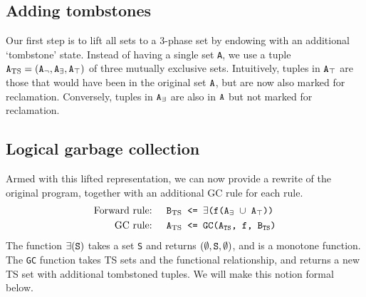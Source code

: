 \documentclass[10pt]{proc}
\numberwithin{equation}{section}
\renewcommand{\tt}[1]{\ifmmode\text{\texttt{#1}}\else\texttt{#1}\fi}
\begin{document}
\subsection{Adding tombstones}
Our first step is to lift all sets to a 3-phase set by endowing with an additional `tombstone' state.
Instead of having a single set \tt{A}, we use a tuple $\tt{A}_\text{TS} = (\tt{A}_\neg, \tt{A}_\exists, \tt{A}_\top)$ of three mutually exclusive sets.
Intuitively, tuples in $\tt{A}_\top$ are those that would have been in the original set $\tt{A}$, but are now also marked for reclamation.
Conversely, tuples in $\tt{A}_\exists$ are also in $\tt{A}$ but not marked for reclamation.


\subsection{Logical garbage collection}
Armed with this lifted representation, we can now provide a rewrite of the original program, together with an additional GC rule for each rule.
\begin{align}
\text{Forward rule: } && \tt{B}_\text{TS} &\tt{ <= $\exists$(f(A$_\exists$ $\cup$ A$_\top$))}\label{eq:forwardrule}\\
\text{GC rule: } && \tt{A}_\text{TS} &\tt{ <= GC(A$_\text{TS}$, f, B$_\text{TS}$)}\label{eq:gcrule}
\end{align}
The function $\exists(\tt{S})$ takes a set \tt{S} and returns $(\emptyset, \tt{S}, \emptyset)$, and is a monotone function.
The \tt{GC} function takes TS sets and the functional relationship, and returns a new TS set with additional tombstoned tuples.
We will make this notion formal below.
\end{document}
